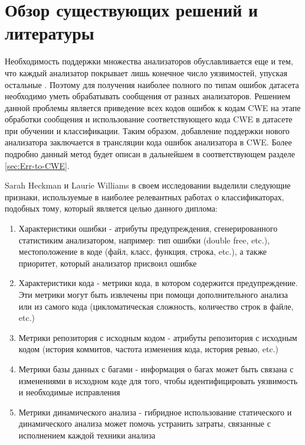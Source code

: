 \chapter{Обзор существующих решений и литературы}
\label{sec:Chapter2} 

Необходимость поддержки множества анализаторов обуславливается еще и тем, что каждый анализатор покрывает лишь конечное число уязвимостей, упуская остальные\cite{Delaitre2013OfMS} \cite{3291} \cite{Bessey2010AFB}. Поэтому для получения наиболее полного по типам ошибок датасета необходимо уметь обрабатывать сообщения от разных анализаторов. Решением данной проблемы является приведение всех кодов ошибок к кодам CWE \cite{CWE-doc} на этапе обработки сообщения и использование соответствующего кода CWE в датасете при обучении и классификации. Таким образом, добавление поддержки нового анализатора заключается в трансляции кода ошибок анализатора в CWE. Более подробно данный метод будет описан в дальнейшем в соответствующем разделе \ref{sec:Err-to-CWE}.

Sarah Heckman и Laurie Williams в своем исследовании\cite{HECKMAN2011363} выделили следующие признаки, используемые в наиболее релевантных работах о классификаторах, подобных тому, который является целью данного диплома:
\begin{enumerate}
    \item Характеристики ошибки - атрибуты предупреждения, сгенерированного статистиким анализатором, например: тип ошибки (double free, etc.), местоположение в коде (файл, класс, функция, строка, etc.), а также приоритет, который анализатор присвоил ошибке
    \item Характеристики кода - метрики кода, в котором содержится предупреждение. Эти метрики могут быть извлечены при помощи дополнительного анализа или из самого кода (цикломатическая сложность, количество строк в файле, etc.)
    \item Метрики репозитория с исходным кодом - атрибуты репозитория с исходным кодом (история коммитов, частота изменения кода, история ревью, etc.)
    \item Метрики базы данных с багами - информация о багах может быть связана с изменениями в исходном коде для того, чтобы идентифицировать уязвимость и необходимые исправления
    \item Метрики динамического анализа - гибридное использование статического и динамического анализа может помочь устранить затраты, связанные с исполнением каждой техники анализа
\end{enumerate}

